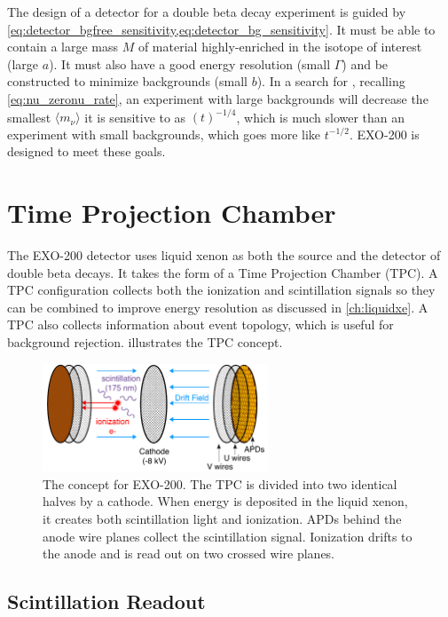 \documentclass[herrin-thesis.tex]{subfiles}
\begin{document}
The design of a detector for a double beta decay experiment is guided by \cref{eq:detector_bgfree_sensitivity,eq:detector_bg_sensitivity}. It must be able to contain a large mass \(M\) of material highly-enriched in the isotope of interest (large \(a\)). It must also have a good energy resolution (small \(\Gamma\)) and be constructed to minimize backgrounds (small \(b\)). In a search for \zeronu{}, recalling \cref{eq:nu_zeronu_rate}, an experiment with large backgrounds will decrease the smallest  \(\langle m_{\nu} \rangle\) it is sensitive to as \((t)^{-1/4}\), which is much slower than an experiment with small backgrounds, which goes more like \(t^{-1/2}\). EXO-200 is designed to meet these goals.

\section{Time Projection Chamber}
The EXO-200 detector uses liquid xenon as both the source and the detector of double beta decays. It takes the form of a Time Projection Chamber (TPC). A TPC configuration collects both the ionization and scintillation signals so they can be combined to improve energy resolution as discussed in \cref{ch:liquidxe}. A TPC also collects information about event topology, which is useful for background rejection.  illustrates the TPC concept.
\begin{figure}
\centering
\includegraphics[width=0.6\textwidth]{./figures/detector_tpc_schematic.pdf}
\caption[A conceptual drawing of EXO-200]{The concept for EXO-200. The TPC is divided into two identical halves by a cathode. When energy is deposited in the liquid xenon, it creates both scintillation light and ionization. APDs behind the anode wire planes collect the scintillation signal. Ionization drifts to the anode and is read out on two crossed wire planes.}
\label{fig:detector_tpc_cartoon}
\end{figure}

\subsection{Scintillation Readout}
\end{document}
